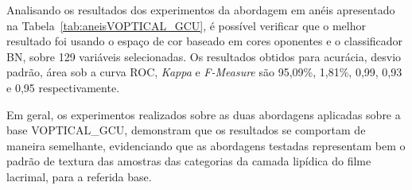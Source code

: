 Analisando os resultados dos experimentos da abordagem em anéis apresentado na Tabela~\ref{tab:aneisVOPTICAL_GCU}, é possível verificar que o melhor resultado foi usando o espaço de cor baseado em cores oponentes e o classificador BN, sobre 129 variáveis selecionadas. Os resultados obtidos para acurácia, desvio padrão, área sob a curva ROC, \textit{Kappa} e \textit{F-Measure} são 95,09\%, 1,81\%, 0,99, 0,93 e 0,95 respectivamente.

Em geral, os experimentos realizados sobre as duas abordagens aplicadas sobre a base VOPTICAL\_GCU, demonstram que os resultados se comportam de maneira semelhante, evidenciando que as abordagens testadas representam bem o padrão de textura das amostras das categorias da camada lipídica do filme lacrimal, para a referida base.

\begin{table}[!ht]
\centering
\onehalfspacing
\caption{Resultados produzidos sobre a base VOPTICAL\_GCU, aplicando a função K de \textit{Ripley} usando abordagem em anéis.}
\label{tab:aneisVOPTICAL_GCU}
\end{table}

